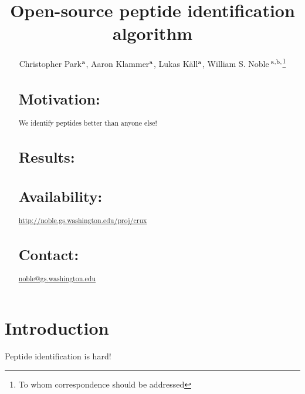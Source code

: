 \documentclass{bioinfo}
\begin{document}

\title[Open-source peptide identification algorithm]{Open-source
peptide identification algorithm}
\author[Park \textit{et~al}]{Christopher Park$^{\rm a}$, Aaron Klammer$^{\rm a}$,
Lukas K\"{a}ll$^{\rm a}$, 
William S. Noble\,$^{\rm a,b,}$\footnote{To whom correspondence should be addressed}}
\address{
$^{\rm a}$Department of Computer Science and Engineering,
$^{\rm b}$Department of Genome Sciences, University of Washington,
  Seattle, WA, USA
}


\maketitle

\begin{abstract}
\section{Motivation:}

We identify peptides better than anyone else! 

\section{Results:}

\section{Availability:}
\href{http://noble.gs.washington.edu/proj/crux}{http://noble.gs.washington.edu/proj/crux}
\section{Contact:} \href{noble@gs.washington.edu}{noble@gs.washington.edu}
\end{abstract}

\section{Introduction}

Peptide identification is hard!
\end{document}
